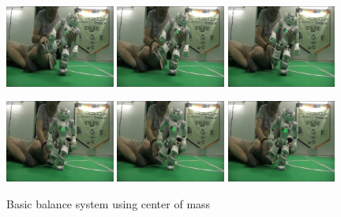 \begin{figure}[!h]
\centerline{
\includegraphics[width=0.32\textwidth]{Figures/Demo2/1.png}
\includegraphics[width=0.32\textwidth]{Figures/Demo2/2.png}
\includegraphics[width=0.32\textwidth]{Figures/Demo2/3.png}
}
\vspace*{0.06cm}
\centerline{
\includegraphics[width=0.32\textwidth]{Figures/Demo2/4.png}
\includegraphics[width=0.32\textwidth]{Figures/Demo2/5.png}
\includegraphics[width=0.32\textwidth]{Figures/Demo2/6.png}
}
\vspace{-0.1cm}
\caption{Basic balance system using center of mass}
\label{demo1}
\vspace*{0.5cm}
\end{figure}
